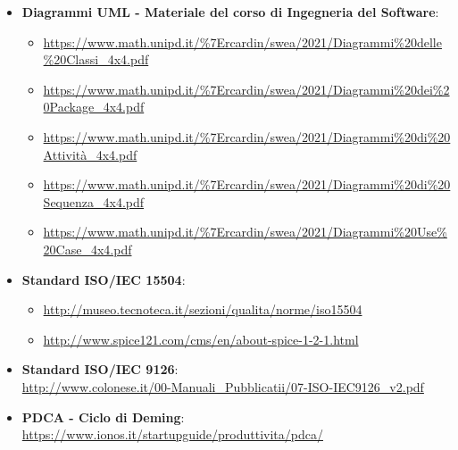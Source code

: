 \begin{itemize}
	\item \textbf{Diagrammi UML - Materiale del corso di Ingegneria del Software}:
	\begin{itemize}
		\item \url {https://www.math.unipd.it/%7Ercardin/swea/2021/Diagrammi%20delle%20Classi_4x4.pdf}
		\item \url {https://www.math.unipd.it/%7Ercardin/swea/2021/Diagrammi%20dei%20Package_4x4.pdf}
		\item \url {https://www.math.unipd.it/%7Ercardin/swea/2021/Diagrammi%20di%20Attività_4x4.pdf}
		\item \url {https://www.math.unipd.it/%7Ercardin/swea/2021/Diagrammi%20di%20Sequenza_4x4.pdf}
		\item \url{https://www.math.unipd.it/%7Ercardin/swea/2021/Diagrammi%20Use%20Case_4x4.pdf}		
	\end{itemize}
	\item \textbf{Standard ISO/IEC 15504}: 
	\begin{itemize}
			\item \url{http://museo.tecnoteca.it/sezioni/qualita/norme/iso15504}
			\item \url{http://www.spice121.com/cms/en/about-spice-1-2-1.html}
	\end{itemize}
	\item \textbf{Standard ISO/IEC 9126}:\\
	\url{http://www.colonese.it/00-Manuali_Pubblicatii/07-ISO-IEC9126_v2.pdf}
	\item \textbf{PDCA - Ciclo di Deming}:\\
	\url{https://www.ionos.it/startupguide/produttivita/pdca/}
\end{itemize}